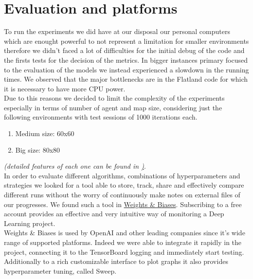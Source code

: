 \section{Evaluation and platforms}
To run the experiments we did have at our disposal our personal computers which are enought powerful to not represent a limitation for smaller environments therefore  we didn't faced a lot of difficulties for the initial debug of the code and the firsts tests for the decision of the metrics. In bigger instances primary focused to the evaluation of the models we instead experienced a slowdown in the running times. We observed that the major bottlenecks are in the Flatland code for which it is necessary to have more CPU power.\\
Due to this reasons we decided to limit the complexity of the experiments especially in terms of number of agent and map size, considering just the following environments with test sessions of 1000 iterations each.
\begin{enumerate}
	\item Medium size: 60x60
	\item Big size: 80x80
\end{enumerate}
\textit{(detailed features of each one can be found in \hyperref[sec:ourParameters])}.\\
In order to evaluate different algorithms, combinations of hyperparameters and strategies we looked for a tool able to store, track, share and effectively compare different runs without the worry of continuously make notes on external files of our progresses.
We found such a tool in \href{https://www.wandb.com/}{Weights \& Biases}.
Subscribing to a free account provides an effective and very intuitive way of monitoring a Deep Learning project.\\
Weights \& Biases is used by OpenAI and other leading companies since it's wide range of supported platforms. Indeed we were able to integrate it rapidly in the project, connecting it to the TensorBoard logging and immediately start testing.\\
Additionally to a rich customizable interface to plot graphs it also provides hyperparameter tuning, called Sweep.
